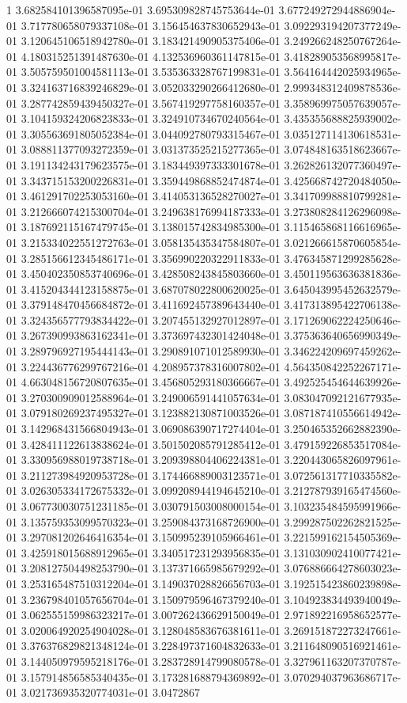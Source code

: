 1	3.682584101396587095e-01	3.695309828745753644e-01	3.677249272944886904e-01	3.717780658079337108e-01	3.156454637830652943e-01	3.092293194207377249e-01	3.120645106518942780e-01	3.183421490905375406e-01	3.249266248250767264e-01	4.180315251391487630e-01	4.132536960361147815e-01	3.418289053568995817e-01	3.505759501004581113e-01	3.535363328767199831e-01	3.564164442025934965e-01	3.324163716839246829e-01	3.052033290266412680e-01	2.999348312409878536e-01	3.287742859439450327e-01	3.567419297758160357e-01	3.358969975057639057e-01	3.104159324206823833e-01	3.324910734670240564e-01	3.435355688825939002e-01	3.305563691805052384e-01	3.044092780793315467e-01	3.035127114130618531e-01	3.088811377093272359e-01	3.031373525215277365e-01	3.074848163518623667e-01	3.191134243179623575e-01	3.183449397333301678e-01	3.262826132077360497e-01	3.343715153200226831e-01	3.359449868852474874e-01	3.425668742720484050e-01	3.461291702253053160e-01	3.414053136528270027e-01	3.341709988810799281e-01	3.212666074215300704e-01	3.249638176994187333e-01	3.273808284126296098e-01	3.187692115167479745e-01	3.138015742834985300e-01	3.115465868116616965e-01	3.215334022551272763e-01	3.058135435347584807e-01	3.021266615870605854e-01	3.285156612345486171e-01	3.356990220322911833e-01	3.476345871299285628e-01	3.450402350853740696e-01	3.428508243845803660e-01	3.450119563636381836e-01	3.415204344123158875e-01	3.687078022800620025e-01	3.645043995452632579e-01	3.379148470456684872e-01	3.411692457389643440e-01	3.417313895422706138e-01	3.324356577793834422e-01	3.207455132927012897e-01	3.171269062224250646e-01	3.267390993863162341e-01	3.373697432301424048e-01	3.375363640656990349e-01	3.289796927195444143e-01	3.290891071012589930e-01	3.346224209697459262e-01	3.224436776299767216e-01	4.208957378316007802e-01	4.564350842252267171e-01	4.663048156720807635e-01	3.456805293180366667e-01	3.492525454644639926e-01	3.270300909012588964e-01	3.249006591441057634e-01	3.083047092121677935e-01	3.079180269237495327e-01	3.123882130871003526e-01	3.087187410556614942e-01	3.142968431566804943e-01	3.069086390717274404e-01	3.250465352662882390e-01	3.428411122613838624e-01	3.501502085791285412e-01	3.479159226853517084e-01	3.330956988019738718e-01	3.209398804406224381e-01	3.220443065826097961e-01	3.211273984920953728e-01	3.174466889003123571e-01	3.072561317710335582e-01	3.026305334172675332e-01	3.099208944194645210e-01	3.212787939165474560e-01	3.067730030751231185e-01	3.030791503008000154e-01	3.103235484595991966e-01	3.135759353099570323e-01	3.259084373168726900e-01	3.299287502262821525e-01	3.297081202646416354e-01	3.150995239105966461e-01	3.221599162154505369e-01	3.425918015688912965e-01	3.340517231293956835e-01	3.131030902410077421e-01	3.208127504498253790e-01	3.137371665985679292e-01	3.076886664278603023e-01	3.253165487510312204e-01	3.149037028826656703e-01	3.192515423860239898e-01	3.236798401057656704e-01	3.150979596467379240e-01	3.104923834493940049e-01	3.062555159986323217e-01	3.007262436629150049e-01	2.971892216958652577e-01	3.020064920254904028e-01	3.128048583676381611e-01	3.269151872273247661e-01	3.376376829821348124e-01	3.228497371604832633e-01	3.211648090516921461e-01	3.144050979595218176e-01	3.283728914799080578e-01	3.327961163207370787e-01	3.157914856585340435e-01	3.173281688794369892e-01	3.070294037963686717e-01	3.021736935320774031e-01	3.0472867